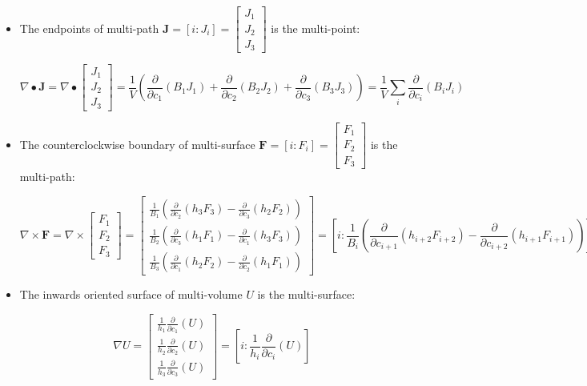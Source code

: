\documentclass{book}
\begin{document}
\begin{itemize}
\item The endpoints of multi-path \(\mathbf{J} = [i : J_i] = \begin{bmatrix} J_1 \\ J_2 \\ J_3 \end{bmatrix}\) is the multi-point:

\[\nabla \bullet \mathbf{J} = \nabla \bullet \begin{bmatrix} J_1 \\ J_2 \\ J_3 \end{bmatrix} = \frac{1}{V}\left(\frac{\partial}{\partial c_1}(B_1 J_1) + \frac{\partial}{\partial c_2}(B_2 J_2) + \frac{\partial}{\partial c_3}(B_3 J_3)\right) = \frac{1}{V}\sum_i \frac{\partial}{\partial c_i} (B_i J_i)\]


\item The counterclockwise boundary of multi-surface \(\mathbf{F} = [i : F_i] = \begin{bmatrix} F_1 \\ F_2 \\ F_3 \end{bmatrix}\) is the multi-path:

\[\nabla \times \mathbf{F} = \nabla \times \begin{bmatrix} F_1 \\ F_2 \\ F_3 \end{bmatrix} = \begin{bmatrix} \frac{1}{B_1}\left(\frac{\partial}{\partial c_2}(h_3 F_3) - \frac{\partial}{\partial c_3}(h_2 F_2)\right) \\ \frac{1}{B_2}\left(\frac{\partial}{\partial c_3}(h_1 F_1) - \frac{\partial}{\partial c_1}(h_3 F_3)\right) \\ \frac{1}{B_3}\left(\frac{\partial}{\partial c_1}(h_2 F_2) - \frac{\partial}{\partial c_2}(h_1 F_1)\right) \end{bmatrix} = \left[ i : \frac{1}{B_i}\left(\frac{\partial}{\partial c_{i+1}}(h_{i+2} F_{i+2}) - \frac{\partial}{\partial c_{i+2}}(h_{i+1} F_{i+1})\right) \right]\]


\item The inwards oriented surface of multi-volume \(U\) is the multi-surface:

\[\nabla U = \begin{bmatrix} \frac{1}{h_1}\frac{\partial}{\partial c_1}(U) \\ \frac{1}{h_2}\frac{\partial}{\partial c_2}(U) \\ \frac{1}{h_3}\frac{\partial}{\partial c_3}(U) \end{bmatrix} = \left[ i :  \frac{1}{h_i}\frac{\partial}{\partial c_i}(U)\right]\]
\end{itemize}
\end{document}
